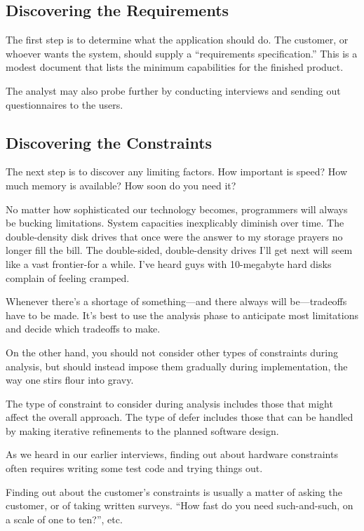\subsection{Discovering the Requirements}

\noindent The first step is to determine what the application should do. The
customer, or whoever wants the system, should supply a ``requirements
specification.'' This is a modest document that lists the minimum
capabilities for the finished product.

The analyst may also probe further by conducting interviews and
sending out questionnaires to the users.

\subsection{Discovering the Constraints}

\noindent The next step is to discover any limiting factors. How important is
speed? How much memory is available? How soon do you need it?

No matter how sophisticated our technology becomes,
programmers will always be bucking limitations. System capacities inexplicably
diminish over time. The double-density disk drives that once were the
answer to my storage prayers no longer fill the bill. The double-sided,
double-density drives I'll get next will seem like a vast frontier-for a
while. I've heard guys with 10-megabyte hard disks complain of feeling
cramped.

Whenever there's a shortage of something---and there always will
be---tradeoffs have to be made. It's best to use the analysis phase to
anticipate most limitations and decide which tradeoffs to make.

On the other hand, you should not consider other types of
constraints during analysis, but should instead impose them gradually
during implementation, the way one stirs flour into gravy.

The type of constraint to consider during analysis includes those
that might affect the overall approach. The type of defer includes those
that can be handled by making iterative refinements to the planned
software design.

As we heard in our earlier interviews, finding out about hardware
constraints often requires writing some test code and trying things out.

Finding out about the customer's constraints is usually a matter of
asking the customer, or of taking written surveys. ``How fast do you need
such-and-such, on a scale of one to ten?'', etc.

